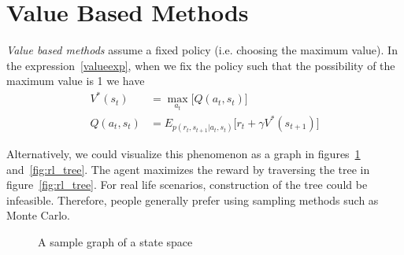 \documentclass{book}
\numberwithin{equation}{subsection}
\begin{document}
\section{Value Based Methods}
\textit{Value based methods} assume a fixed policy (i.e. choosing the maximum value). In the expression~\ref{valueexp}, when we fix the policy such that the possibility of the maximum value is 1 we have
\begin{align}
    V^*(s_t) &= \max_{a_t}\big[Q(a_t, s_t)\big]\\
    Q(a_t, s_t) &= E_{p(r_t,s_{t+1}|a_t,s_t)}\big[r_t+\gamma V^*(s_{t+1})\big]
\end{align}

Alternatively, we could visualize this phenomenon as a graph in figures~\ref{fig:rl_graph} and~\ref{fig:rl_tree}. The agent maximizes the reward by traversing the tree in figure~\ref{fig:rl_tree}. For real life scenarios, construction of the tree could be infeasible. Therefore, people generally prefer using sampling methods such as Monte Carlo.

\begin{figure}[H]
\centering
{}
\caption{A sample graph of a state space}
\label{fig:rl_graph}
\end{figure}
\end{document}
